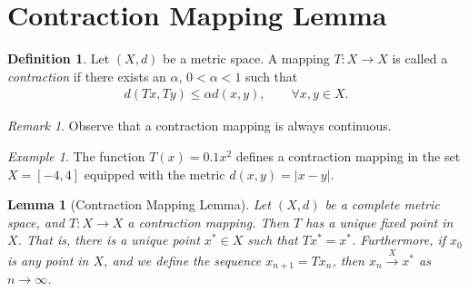 \documentclass[12pt,reqno]{amsart}
\numberwithin{equation}{section}  %
\numberwithin{figure}{section}
\theoremstyle{plain}
\newtheorem{lemma}{Lemma}
\theoremstyle{definition}
\newtheorem{definition}{Definition}
\theoremstyle{remark}
\newtheorem{remark}{Remark}
\newtheorem{example}{Example}
\begin{document}
\section{Contraction Mapping Lemma}
\begin{definition}
  Let $\left( X, d \right)$ be a metric space. A mapping $T: X \to X$ is called a
\emph{contraction} if there exists an $\alpha$, $0 < \alpha <1$ such that
%
%
\begin{equation*}
	\begin{split}
		d(Tx, Ty) \le \alpha d(x,y), \qquad \forall x, y \in X.
	\end{split}
\end{equation*}
%
\end{definition}
%
\begin{framed}
\begin{remark}
	Observe that a contraction mapping is always continuous.
\end{remark}
\end{framed}
%
%
\begin{framed}
\begin{example}
	The function $T(x) = 0.1x^2$ defines a contraction mapping in the set 
	$X = [-4, 4]$ equipped with the metric $d(x,y) = |x-y|$. 
\end{example}
\end{framed}
	\begin{lemma}[Contraction Mapping Lemma]
		\label{lem:fixed-point}
	Let $(X,d)$ be a complete metric space, and $T: X \to X$ a contraction
	mapping. Then $T$ has a unique fixed point in $X$. That is, there is a unique
	point $x^* \in X$ such that $Tx^* = x^*$. Furthermore, if $x_0$ is any point
  in $X$, and we define the sequence $x_{n+1} = Tx_n$, then $x_n \xrightarrow{X} x^*$ as $n
	\to \infty$.
	\end{lemma}
\end{document}
